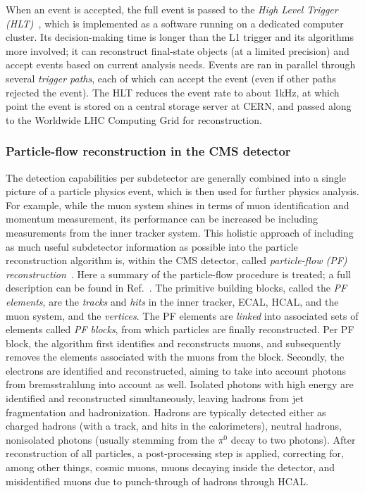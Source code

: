 When an event is accepted, the full event is passed to the \textit{High Level Trigger (HLT)}~\cite{Adam:2005zf}, which is implemented as a software running on a dedicated computer cluster.
% 
Its decision-making time is longer than the L1 trigger and its algorithms more involved; it can reconstruct final-state objects (at a limited precision) and accept events based on current analysis needs.
% 
Events are ran in parallel through several \textit{trigger paths}, each of which can accept the event (even if other paths rejected the event).
% 
The HLT reduces the event rate to about 1\unit{kHz}, at which point the event is stored on a central storage server at CERN, and passed along to the Worldwide LHC Computing Grid for reconstruction.



\subsubsection{Particle-flow reconstruction in the CMS detector}

The detection capabilities per subdetector
are generally combined into a single picture of a particle physics event, which is then used for further physics analysis.
% 
For example, while the muon system shines in terms of muon identification and momentum measurement, its performance can be increased be including measurements from the inner tracker system.
% 
This holistic approach of including as much useful subdetector information as possible into the particle reconstruction algorithm is, within the CMS detector, called \textit{particle-flow (PF) reconstruction}~\cite{Sirunyan:2017ulk}.
% 
Here a summary of the particle-flow procedure is treated; a full description can be found in Ref.~\cite{Sirunyan:2017ulk}.
% 
The primitive building blocks, called the \textit{PF elements}, are the \textit{tracks} and \textit{hits} in the inner tracker, ECAL, HCAL, and the muon system, and the \textit{vertices}.
% 
The PF elements are \textit{linked} into associated sets of elements called \textit{PF blocks}, from which particles are finally reconstructed.
% 
Per PF block, the algorithm first identifies and reconstructs muons, and subsequently removes the elements associated with the muons from the block.
% 
Secondly, the electrons are identified and reconstructed, aiming to take into account photons from bremsstrahlung into account as well.
% 
Isolated photons with high energy are identified and reconstructed simultaneously, leaving hadrons from jet fragmentation and hadronization.
% 
Hadrons are typically detected either as charged hadrons (with a track, and hits in the calorimeters), neutral hadrons, nonisolated photons (usually stemming from the $\pi^0$ decay to two photons).
% 
After reconstruction of all particles, a post-processing step is applied, correcting for, among other things, cosmic muons, muons decaying inside the detector, and misidentified muons due to punch-through of hadrons through HCAL.



